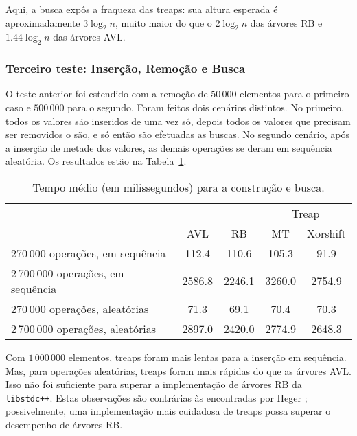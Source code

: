 Aqui, a busca expôs a fraqueza das treaps:
sua altura esperada é aproximadamente $3 \log_2 n$,
muito maior do que o $2\log_2 n$ das árvores RB
e $1.44 \log_2 n$ das árvores AVL.

\subsubsection{Terceiro teste: Inserção, Remoção e Busca}

O teste anterior foi estendido com a remoção de $50\,000$ elementos
para o primeiro caso e $500\,000$ para o segundo.
Foram feitos dois cenários distintos.
No primeiro, todos os valores são inseridos de uma vez só,
depois todos os valores que precisam ser removidos o são,
e só então são efetuadas as buscas.
No segundo cenário, após a inserção de metade dos valores,
as demais operações se deram em sequência aleatória.
Os resultados estão na Tabela~\ref{tab:mixed}.

\begin{table}[h]
    \centering
    \begin{tabular}{l c c c c}
        & & & \multicolumn{2}{c}{Treap} \\ \cmidrule{4-5}
            & AVL & RB & MT & Xorshift \\
        \midrule
        $270\,000$ operações, em sequência & 112.4 & 110.6 & 105.3 & 91.9 \\
        $2\,700\,000$ operações, em sequência & 2586.8 & 2246.1 & 3260.0 & 2754.9 \\
        $270\,000$ operações, aleatórias & 71.3 & 69.1 & 70.4 & 70.3 \\
        $2\,700\,000$ operações, aleatórias & 2897.0 & 2420.0 & 2774.9 & 2648.3 \\
        \bottomrule
    \end{tabular}
    \caption{Tempo médio (em milissegundos) para a construção e busca.}
    \label{tab:mixed}
\end{table}

Com $1\,000\,000$ elementos,
treaps foram mais lentas para a inserção em sequência.
Mas, para operações aleatórias,
treaps foram mais rápidas do que as árvores AVL.
Isso não foi suficiente para superar a implementação de árvores RB da \texttt{libstdc++}.
Estas observações são contrárias às encontradas por Heger \cite[p.65]{Heger2004};
possivelmente,
uma implementação mais cuidadosa de treaps
possa superar o desempenho de árvores RB.
